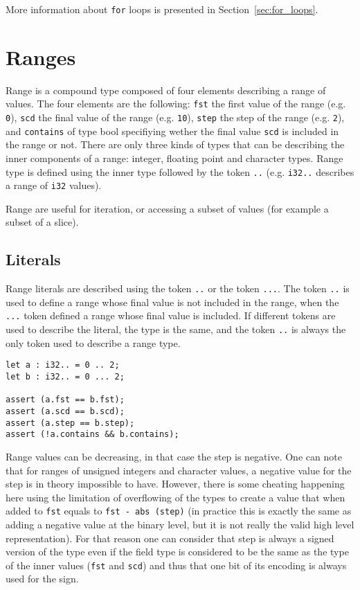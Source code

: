 More information about \texttt{for} loops is presented in
Section~\ref{sec:for_loops}.

\section {Ranges}

Range is a compound type composed of four elements describing a range of values.
The four elements are the following: \texttt{fst} the first value of the range
(e.g. \texttt{0}), \texttt{scd} the final value of the range (e.g. \texttt{10}),
\texttt{step} the step of the range (e.g. \texttt{2}), and \texttt{contains} of
type bool specifiying wether the final value \texttt{scd} is included in the
range or not. There are only three kinds of types that can be describing the
inner components of a range: integer, floating point and character types. Range
type is defined using the inner type followed by the token \texttt{..} (e.g.
\texttt{i32..} describes a range of \texttt{i32} values).

Range are useful for iteration, or accessing a subset of values (for example a
subset of a slice).

\subsection {Literals}

Range literals are described using the token \texttt{..} or the token
\texttt{...}. The token \texttt{..} is used to define a range whose final value
is not included in the range, when the \texttt{...} token defined a range whose
final value is included. If different tokens are used to describe the literal,
the type is the same, and the token \texttt{..} is always the only token used to
describe a range type.

\begin{lstlisting}[style=coloredverbatim]
let a : i32.. = 0 .. 2;
let b : i32.. = 0 ... 2;

assert (a.fst == b.fst);
assert (a.scd == b.scd);
assert (a.step == b.step);
assert (!a.contains && b.contains);
\end{lstlisting}

Range values can be decreasing, in that case the step is negative. One can note
that for ranges of unsigned integers and character values, a negative value for
the step is in theory impossible to have. However, there is some cheating
happening here using the limitation of overflowing of the types to create a
value that when added to \texttt{fst} equals to \texttt{fst - abs (step)} (in
practice this is exactly the same as adding a negative value at the binary
level, but it is not really the valid high level representation). For that
reason one can consider that step is always a signed version of the type even if
the field type is considered to be the same as the type of the inner values
(\texttt{fst} and \texttt{scd}) and thus that one bit of its encoding is always
used for the sign.

